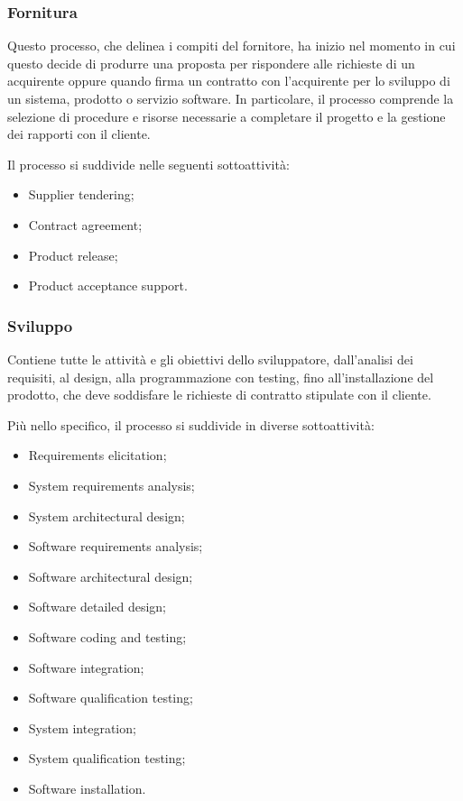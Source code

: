 \subsubsection{Fornitura}
Questo processo, che delinea i compiti del fornitore, ha inizio nel momento in cui questo decide di produrre una proposta per rispondere alle richieste di un acquirente oppure quando firma un contratto con l'acquirente per lo sviluppo di un sistema, prodotto o servizio software. In particolare, il processo comprende la selezione di procedure e risorse necessarie a completare il progetto e la gestione dei rapporti con il cliente.
\par Il processo si suddivide nelle seguenti sottoattività:
\begin{itemize}
    \item Supplier tendering;
    \item Contract agreement;
    \item Product release;
    \item Product acceptance support.
\end{itemize}
\subsubsection{Sviluppo}
Contiene tutte le attività e gli obiettivi dello sviluppatore, dall'analisi dei requisiti, al design, alla programmazione con testing, fino all'installazione del prodotto, che deve soddisfare le richieste di contratto stipulate con il cliente.
\par Più nello specifico, il processo si suddivide in diverse sottoattività:
\begin{itemize}
    \item Requirements elicitation;
    \item System requirements analysis;
    \item System architectural design;
    \item Software requirements analysis;
    \item Software architectural design;
    \item Software detailed design;
    \item Software coding and testing;
    \item Software integration;
    \item Software qualification testing;
    \item System integration;
    \item System qualification testing;
    \item Software installation.
\end{itemize}
